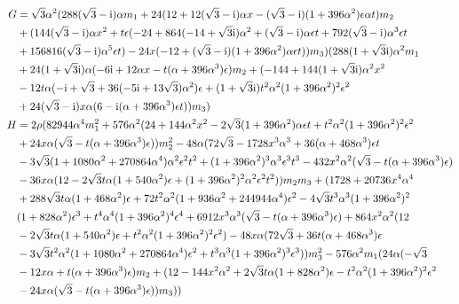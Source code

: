 \documentclass[12pt]{article}
\begin{document}
\begin{align}
  G &= \sqrt{3}\alpha^{2}(288(\sqrt{3}-\mathrm{i})\alpha m_{1} + 24(12+12(\sqrt{3}-\mathrm{i})\alpha x - (\sqrt{3}-\mathrm{i})(1+396\alpha^{2})\epsilon\alpha t)m_{2} \notag\\
  & + (144(\sqrt{3}-\mathrm{i})\alpha x^{2} + t\epsilon (-24+864(-14+\sqrt{3}\mathrm{i})\alpha^{2} + (\sqrt{3}-\mathrm{i})\alpha\epsilon t + 792(\sqrt{3}-\mathrm{i})\alpha^{3}\epsilon t \notag\\
  & + 156816(\sqrt{3}-\mathrm{i})\alpha^{5}\epsilon t) - 24x(-12+(\sqrt{3}-\mathrm{i})(1+396\alpha^{2})\alpha\epsilon t))m_{3})(288(1+\sqrt{3}\mathrm{i})\alpha^{2}m_{1} \notag\\
  & +24(1+\sqrt{3}\mathrm{i})\alpha(-6\mathrm{i}+12\alpha x-t(\alpha+396\alpha^{3})\epsilon)m_{2}+(-144+144(1+\sqrt{3}\mathrm{i})\alpha^{2}x^{2} \notag\\
  & -12t\alpha(-\mathrm{i}+\sqrt{3}+36(-5\mathrm{i}+13\sqrt{3})\alpha^{2})\epsilon+(1+\sqrt{3}\mathrm{i})t^{2}\alpha^{2}(1+396\alpha^{2})^{2}\epsilon^{2} \notag\\
  & +24(\sqrt{3}-\mathrm{i})x\alpha(6-\mathrm{i}(\alpha+396\alpha^{3})\epsilon t))m_{3})\\
  H &= 2\rho (82944\alpha^{4}m_{1}^{2}+576\alpha^{2}(24+144\alpha^{2}x^{2}-2\sqrt{3}(1+396\alpha^{2})\alpha\epsilon t + t^{2}\alpha^{2}(1+396\alpha^{2})^{2}\epsilon^{2} \notag\\
  & +24x\alpha(\sqrt{3}-t(\alpha+396\alpha^{3})\epsilon))m_{2}^{2}-48\alpha(72\sqrt{3}-1728x^{3}\alpha^{3}+36(\alpha+468\alpha^{3})\epsilon t \notag\\
  & -3\sqrt{3}(1+1080\alpha^{2}+270864\alpha^{4})\alpha^{2}\epsilon^{2}t^{2}+(1+396\alpha^{2})^{3}\alpha^{3}\epsilon^{3}t^{3}-432x^{2}\alpha^{2}(\sqrt{3}-t(\alpha+396\alpha^{3})\epsilon) \notag\\
  & -36x\alpha(12-2\sqrt{3}t\alpha(1+540\alpha^{2})\epsilon+(1+396\alpha^{2})^{2}\alpha^{2}\epsilon^{2}t^{2}))m_{2}m_{3}+
  (1728+20736x^{4}\alpha^{4} \notag\\
  & +288\sqrt{3}t\alpha(1+468\alpha^{2})\epsilon+72t^{2}\alpha^{2}(1+936\alpha^{2}+244944\alpha^{4})\epsilon^{2}
  -4\sqrt{3}t^{3}\alpha^{3}(1+396\alpha^{2})^{2} \notag\\
  & (1+828\alpha^{2})\epsilon^{3}+t^{4}\alpha^{4}(1+396\alpha^{2})^{4}\epsilon^{4}
  +6912x^{3}\alpha^{3}(\sqrt{3}-t(\alpha+396\alpha^{3})\epsilon)+864x^{2}\alpha^{2}(12 \notag\\
  & -2\sqrt{3}t\alpha(1+540\alpha^{2})\epsilon
  +t^{2}\alpha^{2}(1+396\alpha^{2})^{2}\epsilon^{2})-48x\alpha(72\sqrt{3}+36t(\alpha+468\alpha^{3})\epsilon \notag\\
  & -3\sqrt{3}t^{2}\alpha^{2}(1+1080\alpha^{2}+270864\alpha^{4})\epsilon^{2}+t^{3}\alpha^{3}(1+396\alpha^{2})^{3}\epsilon^{3}))m_{3}^{2}
  -576\alpha^{2}m_{1}(24\alpha(-\sqrt{3} \notag\\
  & -12x\alpha+t(\alpha+396\alpha^{3})\epsilon)m_{2}+(12-144x^{2}\alpha^{2}
  +2\sqrt{3}t\alpha(1+828\alpha^{2})\epsilon-t^{2}\alpha^{2}(1+396\alpha^{2})^{2}\epsilon^{2} \notag\\
  & -24x\alpha(\sqrt{3}-t(\alpha+396\alpha^{3})\epsilon))m_{3}))
\end{align}
\end{document}
